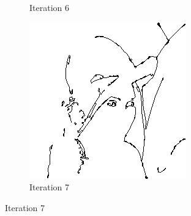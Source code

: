 \documentclass{llncs}
\begin{document}
\begin{figure}
\begin{subfigure}[b]{0.3\textwidth}
                \caption{Iteration 6}
                \label{fig:heu_iter6}
        \end{subfigure}
        \quad
        \begin{subfigure}[b]{0.3\textwidth}
                \includegraphics[width=\textwidth]{IMG/HeuristicInit/Iteration7}
                \caption{Iteration 7}
                \label{fig:heu_iter7}
        \end{subfigure}
        
        \vspace{5mm}
        

\end{figure}
\end{document}
